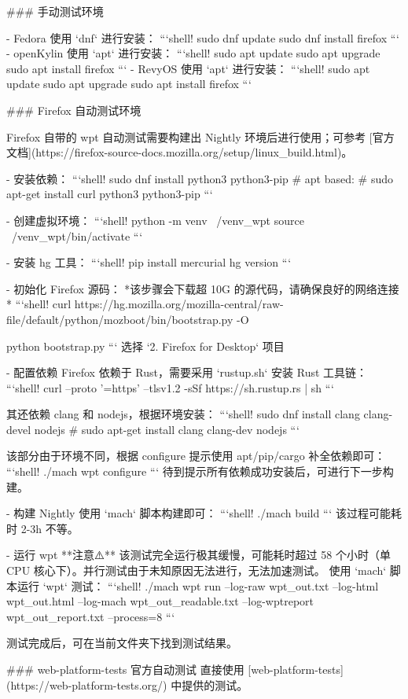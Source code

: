 \documentclass{article}
\begin{document}
\begin{markdown}
### 手动测试环境

- Fedora
使用 `dnf` 进行安装：
```shell!
sudo dnf update
sudo dnf install firefox
```
- openKylin
使用 `apt` 进行安装：
```shell!
sudo apt update
sudo apt upgrade
sudo apt install firefox
```
- RevyOS
使用 `apt` 进行安装：
```shell!
sudo apt update
sudo apt upgrade
sudo apt install firefox
```

### Firefox 自动测试环境

Firefox 自带的 wpt 自动测试需要构建出 Nightly 环境后进行使用；可参考 [官方文档](https://firefox-source-docs.mozilla.org/setup/linux_build.html)。

- 安装依赖：
```shell!
sudo dnf install python3 python3-pip
# apt based:
# sudo apt-get install curl python3 python3-pip
```

- 创建虚拟环境：
```shell!
python -m venv ~/venv_wpt
source ~/venv_wpt/bin/activate
```

- 安装 hg 工具：
```shell!
pip install mercurial
hg version
```

- 初始化 Firefox 源码：
*该步骤会下载超 10G 的源代码，请确保良好的网络连接*
```shell!
curl https://hg.mozilla.org/mozilla-central/raw-file/default/python/mozboot/bin/bootstrap.py -O

python bootstrap.py
```
选择 `2. Firefox for Desktop` 项目

- 配置依赖
Firefox 依赖于 Rust，需要采用 `rustup.sh` 安装 Rust 工具链：
```shell!
curl --proto '=https' --tlsv1.2 -sSf https://sh.rustup.rs | sh
```

其还依赖 clang 和 nodejs，根据环境安装：
```shell!
sudo dnf install clang clang-devel nodejs
# sudo apt-get install clang clang-dev nodejs
```

该部分由于环境不同，根据 configure 提示使用 apt/pip/cargo 补全依赖即可：
```shell!
./mach wpt configure
```
待到提示所有依赖成功安装后，可进行下一步构建。

- 构建 Nightly
使用 `mach` 脚本构建即可：
```shell!
./mach build
```
该过程可能耗时 2-3h 不等。

- 运行 wpt
**注意⚠️** 该测试完全运行极其缓慢，可能耗时超过 58 个小时（单 CPU 核心下）。并行测试由于未知原因无法进行，无法加速测试。
使用 `mach` 脚本运行 `wpt` 测试：
```shell!
./mach wpt run --log-raw wpt_out.txt --log-html wpt_out.html --log-mach wpt_out_readable.txt --log-wptreport wpt_out_report.txt --process=8
```

测试完成后，可在当前文件夹下找到测试结果。

### web-platform-tests 官方自动测试
直接使用 [web-platform-tests](https://web-platform-tests.org/) 中提供的测试。


\end{markdown}
\end{document}
